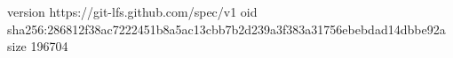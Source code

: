 version https://git-lfs.github.com/spec/v1
oid sha256:286812f38ac7222451b8a5ac13cbb7b2d239a3f383a31756ebebdad14dbbe92a
size 196704
